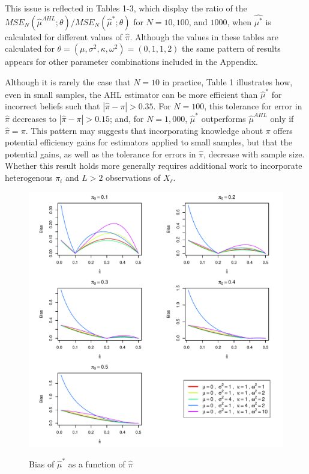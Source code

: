 \documentclass[12pt]{article}
\begin{document}
This issue is reflected in Tables 1-3, which display the ratio of the $MSE_N(\hat{\mu}^{AHL};\theta)/MSE_N(\hat{\mu}^*;\theta)$ for $N=10, 100$, and $1000$, when $\hat{\mu^*}$ is calculated for different values of $\hat{\pi}$.  Although the values in these tables are calculated for $\theta = (\mu, \sigma^2, \kappa, \omega^2) = (0,1,1,2)$ the same pattern of results appears for other parameter combinations included in the Appendix. 

Although it is rarely the case that $N=10$ in practice, Table 1 illustrates how, even in small samples, the AHL estimator can be more efficient than $\hat{\mu}^*$ for incorrect beliefs such that $|\hat{\pi}-\pi| >  0.35$.   For $N=100$, this tolerance for error in $\hat{\pi}$ decreases to $|\hat{\pi}-\pi| >  0.15$; and, for $N=1,000$, $\hat{\mu}^*$ outperforms $\hat{\mu}^{AHL}$ only if $\hat{\pi}=\pi$.  This pattern may suggests that incorporating knowledge about $\pi$ offers potential efficiency gains for estimators applied to small samples, but that the potential gains, as well as the tolerance for errors in $\hat{\pi}$, decrease with sample size.  Whether this result holds more generally requires additional work to incorporate heterogenous $\pi_i$ and $L>2$ observations of $X_{\ell}$.  

\begin{figure}[htbp]
\begin{center}
\caption{Bias of $\hat{\mu}^*$ as a function of $\hat{\pi}$ }
\vspace{5pt}
\includegraphics[width=\textwidth]{./Figures/bias_plot.pdf}
\label{bias_plot}
\end{center}
\end{figure}
\end{document}
